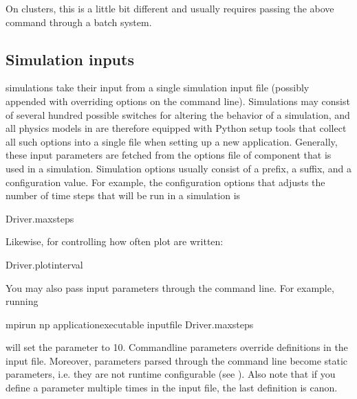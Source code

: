 \documentclass[letterpaper,10pt,english]{sphinxmanual}
\begin{document}
\sphinxAtStartPar
On clusters, this is a little bit different and usually requires passing the above command through a batch system.


\subsection{Simulation inputs}
\label{\detokenize{Base/Control:simulation-inputs}}
\sphinxAtStartPar
{} simulations take their input from a single simulation input file (possibly appended with overriding options on the command line).
Simulations may consist of several hundred possible switches for altering the behavior of a simulation, and all physics models in  are therefore equipped with Python setup tools that collect all such options into a single file when setting up a new application.
Generally, these input parameters are fetched from the options file of component that is used in a simulation.
Simulation options usually consist of a prefix, a suffix, and a configuration value.
For example, the configuration options that adjusts the number of time steps that will be run in a simulation is

\begin{sphinxVerbatim}[commandchars=\\\{\},formatcom=\scriptsize]
Driver.max\PYGZus{}steps  
\end{sphinxVerbatim}

\sphinxAtStartPar
Likewise, for controlling how often plot are written:

\begin{sphinxVerbatim}[commandchars=\\\{\},formatcom=\scriptsize]
Driver.plot\PYGZus{}interval  
\end{sphinxVerbatim}

\sphinxAtStartPar
You may also pass input parameters through the command line. For example, running

\begin{sphinxVerbatim}[commandchars=\\\{\},formatcom=\scriptsize]
mpirun \PYGZhy{}np  \PYGZlt{}application\PYGZus{}executable\PYGZgt{} \PYGZlt{}input\PYGZus{}file\PYGZgt{} Driver.max\PYGZus{}steps
\end{sphinxVerbatim}

\sphinxAtStartPar
will set the  parameter to 10.
Command\sphinxhyphen{}line parameters override definitions in the input file.
Moreover, parameters parsed through the command line become static parameters, i.e. they are not run\sphinxhyphen{}time configurable (see {\hyperref[\detokenize{Base/Control:chap-runtimeconfig}]{}}).
Also note that if you define a parameter multiple times in the input file, the last definition is canon.
\end{document}
